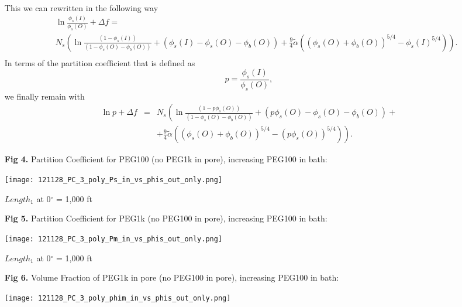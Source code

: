 \documentclass[12pt]{article}
\begin{document}
\begin{itemize}
\begin{eqnarray}
~
\end{eqnarray}
This we can rewritten in the following way
\begin{eqnarray}
& & \ln\frac{\phi_{s}(I)}{\phi_{s}(O)} + \Delta f  = \nonumber\\
& & N_s \left( \ln\frac{(1 - \phi_s(I))}{(1 - \phi_s(O) - \phi_b(O))} + (\phi_{s}(I) - \phi_s(O) - \phi_b(O))+ \frac{9}{4} \tilde\alpha \left( \left( \phi_s(O) + \phi_b(O)\right)^{5/4} - \phi_s(I)^{5/4}\right)\right). \nonumber\\
~
\end{eqnarray}
In terms of the partition coefficient that is defined as
$$p = {\frac{\phi_s(I)}{\phi_s(O)}},$$we finally remain with
\begin{eqnarray}
\ln{p} + \Delta f &=& N_s \left( \ln\frac{(1 - p\phi_s(O))}{(1 - \phi_s(O) - \phi_b(O))} + (p\phi_{s}(O) - \phi_s(O) - \phi_b(O))+ \right.\nonumber\\
&& \left. + \frac{9}{4} \tilde\alpha \left( \left( \phi_s(O) + \phi_b(O)\right)^{5/4} - (p\phi_s(O))^{5/4} \right)\right).
\label{defp1}
\end{eqnarray}


        \item[\bf{Fig 4.}] Partition Coefficient for PEG100 (no PEG1k in pore), increasing PEG100 in bath:\\
		\centerline{\texttt{[image: 121128\_PC\_3\_poly\_Ps\_in\_vs\_phis\_out\_only.png]}}


                $Length_{1}$ at 0$^{\circ}$ = 1,000 ft \\

        \item[\bf{Fig 5.}] Partition Coefficient for PEG1k (no PEG100 in pore), increasing PEG100 in bath:\\
		\centerline{\texttt{[image: 121128\_PC\_3\_poly\_Pm\_in\_vs\_phis\_out\_only.png]}}


                $Length_{1}$ at 0$^{\circ}$ = 1,000 ft \\

        \item[\bf{Fig 6.}] Volume Fraction of PEG1k in pore (no PEG100 in pore), increasing PEG100 in bath:\\
		\centerline{\texttt{[image: 121128\_PC\_3\_poly\_phim\_in\_vs\_phis\_out\_only.png]}}



\end{itemize}
\end{document}
